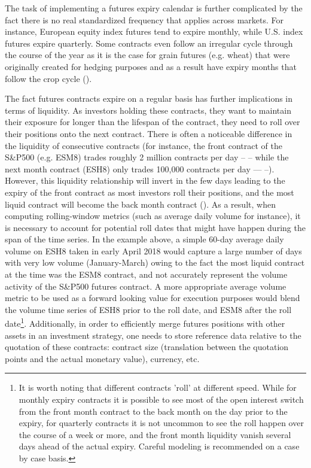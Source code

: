 \begin{itemize}
The task of implementing a futures expiry calendar is further complicated by the fact there is no real standardized frequency that applies across markets. For instance, European equity index futures tend to expire monthly, while U.S. index futures expire quarterly. Some contracts even follow an irregular cycle through the course of the year as it is the case for grain futures (e.g. wheat) that were originally created for hedging purposes and as a result have expiry months that follow the crop cycle ().

The fact futures contracts expire on a regular basis has further implications in terms of liquidity. As investors holding these contracts, they want to maintain their exposure for longer than the lifespan of the contract, they need to roll over their positions onto the next contract. There is often a noticeable difference in the liquidity of consecutive contracts (for instance, the front contract of the S\&P500 (e.g. ESM8) trades roughly 2 million contracts per day --  -- while the next month contract (ESH8) only trades 100,000 contracts per day ---  --). However, this liquidity relationship will invert in the few days leading to the expiry of the front contract as most investors roll their positions, and the most liquid contract will become the back month contract (). As a result, when computing rolling-window metrics (such as average daily volume for instance), it is necessary to account for potential roll dates that might have happen during the span of the time series. In the example above, a simple 60-day average daily volume on ESH8 taken in early April 2018 would capture a large number of days with very low volume (January-March) owing to the fact the most liquid contract at the time was the ESM8 contract, and not accurately represent the volume activity of the S\&P500 futures contract. A more appropriate average volume metric to be used as a forward looking value for execution purposes would blend the volume time series of ESH8 prior to the roll date, and ESM8 after the roll date\footnote{It is worth noting that different contracts 'roll' at different speed. While for monthly expiry contracts it is possible to see most of the open interest switch from the front month contract to the back month on the day prior to the expiry, for quarterly contracts it is not uncommon to see the roll happen over the course of a week or more, and the front month liquidity vanish several days ahead of the actual expiry. Careful modeling is recommended on a case by case basis.}. Additionally, in order to efficiently merge futures positions with other assets in an investment strategy, one needs to store reference data relative to the quotation of these contracts: contract size (translation between the quotation points and the actual monetary value), currency, etc. 


\end{itemize}
